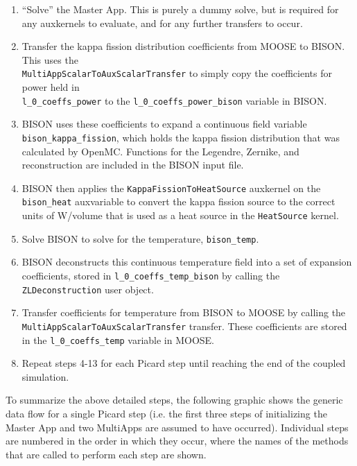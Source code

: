 \documentclass[10pt]{article}
\numberwithin{equation}{section} %
\begin{document}
\begin{enumerate}
\item ``Solve'' the Master App. This is purely a dummy solve, but is required for any auxkernels to evaluate, and for any further transfers to occur.
\item Transfer the kappa fission distribution coefficients from MOOSE to BISON. This uses the \\{\tt MultiAppScalarToAuxScalarTransfer} to simply copy the coefficients for power held in \\{\tt l\_0\_coeffs\_power} to the {\tt l\_0\_coeffs\_power\_bison} variable in BISON.
\item BISON uses these coefficients to expand a continuous field variable {\tt bison\_kappa\_fission}, which holds the kappa fission distribution that was calculated by OpenMC. Functions for the Legendre, Zernike, and reconstruction are included in the BISON input file.
\item BISON then applies the {\tt KappaFissionToHeatSource} auxkernel on the {\tt bison\_heat} auxvariable to convert the kappa fission source to the correct units of W/volume that is used as a heat source in the {\tt HeatSource} kernel.
\item Solve BISON to solve for the temperature, {\tt bison\_temp}.
\item BISON deconstructs this continuous temperature field into a set of expansion coefficients, stored in {\tt l\_0\_coeffs\_temp\_bison} by calling the {\tt ZLDeconstruction} user object.
\item Transfer coefficients for temperature from BISON to MOOSE by calling the \\{\tt MultiAppScalarToAuxScalarTransfer} transfer. These coefficients are stored in the {\tt l\_0\_coeffs\_temp} variable in MOOSE. 
\item Repeat steps 4-13 for each Picard step until reaching the end of the coupled simulation.
\end{enumerate}

To summarize the above detailed steps, the following graphic shows the generic data flow for a single Picard step (i.e. the first three steps of initializing the Master App and two MultiApps are assumed to have occurred). Individual steps are numbered in the order in which they occur, where the names of the methods that are called to perform each step are shown.
\end{document}
